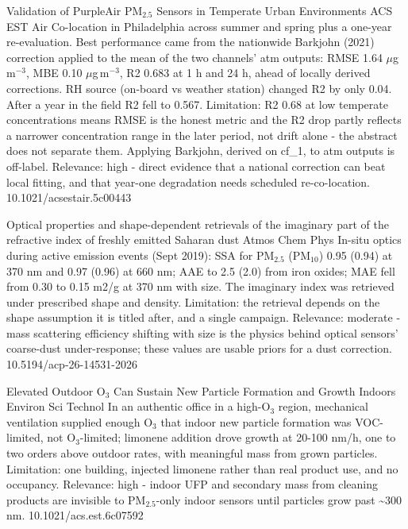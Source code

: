 \documentclass[10pt]{article}
\begin{document}
{Validation of PurpleAir PM$_{2.5}$ Sensors in Temperate Urban Environments}
{ACS EST Air}
{Co-location in Philadelphia across summer and spring plus a one-year re-evaluation. Best performance came from the nationwide Barkjohn (2021) correction applied to the mean of the two channels' atm outputs: RMSE 1.64 $\mu$g\,m$^{-3}$, MBE 0.10 $\mu$g\,m$^{-3}$, R2 0.683 at 1 h and 24 h, ahead of locally derived corrections. RH source (on-board vs weather station) changed R2 by only 0.04. After a year in the field R2 fell to 0.567. Limitation: R2 0.68 at low temperate concentrations means RMSE is the honest metric and the R2 drop partly reflects a narrower concentration range in the later period, not drift alone - the abstract does not separate them. Applying Barkjohn, derived on cf\_1, to atm outputs is off-label. Relevance: high - direct evidence that a national correction can beat local fitting, and that year-one degradation needs scheduled re-co-location.}
{10.1021/acsestair.5c00443}

{Optical properties and shape-dependent retrievals of the imaginary part of the refractive index of freshly emitted Saharan dust}
{Atmos Chem Phys}
{In-situ optics during active emission events (Sept 2019): SSA for PM$_{2.5}$ (PM$_{10}$) 0.95 (0.94) at 370 nm and 0.97 (0.96) at 660 nm; AAE to 2.5 (2.0) from iron oxides; MAE fell from 0.30 to 0.15 m2/g at 370 nm with size. The imaginary index was retrieved under prescribed shape and density. Limitation: the retrieval depends on the shape assumption it is titled after, and a single campaign. Relevance: moderate - mass scattering efficiency shifting with size is the physics behind optical sensors' coarse-dust under-response; these values are usable priors for a dust correction.}
{10.5194/acp-26-14531-2026}

\par{}\baselineskip{}\baselineskip
{}

{Elevated Outdoor O$_3$ Can Sustain New Particle Formation and Growth Indoors}
{Environ Sci Technol}
{In an authentic office in a high-O$_3$ region, mechanical ventilation supplied enough O$_3$ that indoor new particle formation was VOC-limited, not O$_3$-limited; limonene addition drove growth at 20-100 nm/h, one to two orders above outdoor rates, with meaningful mass from grown particles. Limitation: one building, injected limonene rather than real product use, and no occupancy. Relevance: high - indoor UFP and secondary mass from cleaning products are invisible to PM$_{2.5}$-only indoor sensors until particles grow past \textasciitilde{}300 nm.}
{10.1021/acs.est.6c07592}
\end{document}
